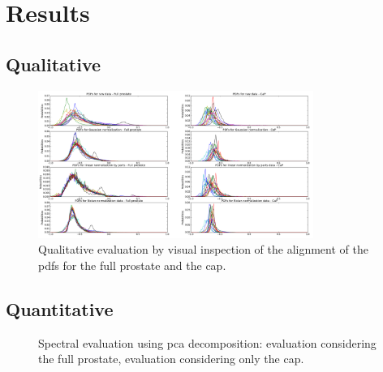 \graphicspath{ {./content/results/figures/} }

\section{Results}
\label{sec:res}

\subsection{Qualitative}

\begin{figure}
  \centering
  \includegraphics[width=0.8\textwidth]{qualitative.png}
  \caption{Qualitative evaluation by visual inspection of the alignment of the \ac{pdf}s for the full prostate and the \ac{cap}.}
  \label{fig:qu}
\end{figure}



\subsection{Quantitative}

\begin{figure}
  \centering
  \hfill
  \caption{Spectral evaluation using \ac{pca} decomposition: \protect{} evaluation considering the full prostate, \protect{} evaluation considering only the \ac{cap}.}
  \label{fig:qt}
\end{figure}

